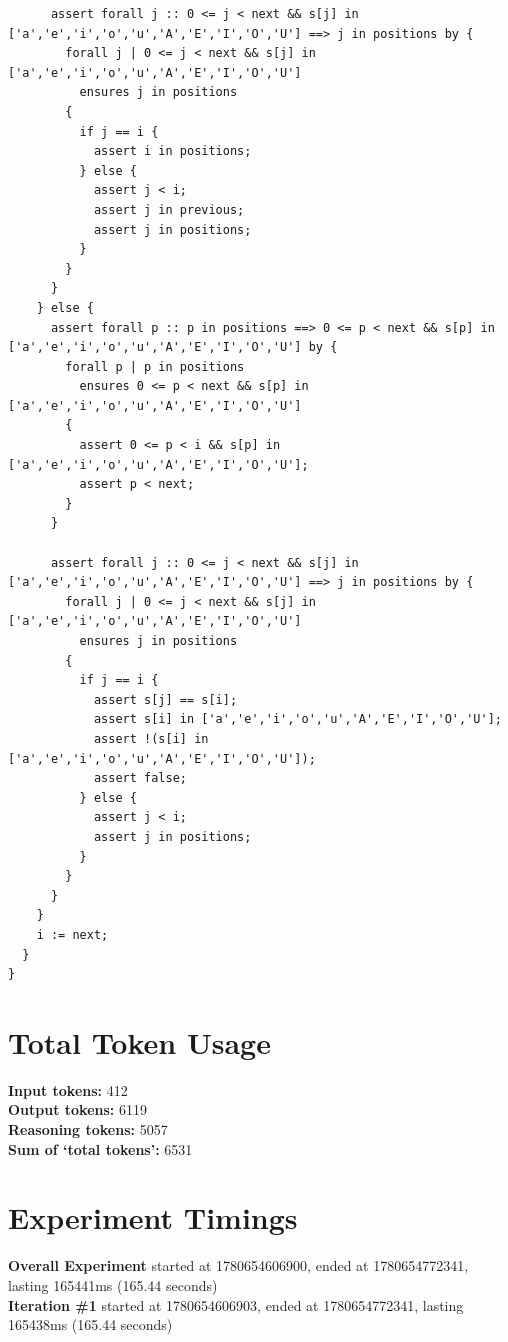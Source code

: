 \documentclass{article}
\begin{document}
\begin{lstlisting}
      assert forall j :: 0 <= j < next && s[j] in ['a','e','i','o','u','A','E','I','O','U'] ==> j in positions by {
        forall j | 0 <= j < next && s[j] in ['a','e','i','o','u','A','E','I','O','U']
          ensures j in positions
        {
          if j == i {
            assert i in positions;
          } else {
            assert j < i;
            assert j in previous;
            assert j in positions;
          }
        }
      }
    } else {
      assert forall p :: p in positions ==> 0 <= p < next && s[p] in ['a','e','i','o','u','A','E','I','O','U'] by {
        forall p | p in positions
          ensures 0 <= p < next && s[p] in ['a','e','i','o','u','A','E','I','O','U']
        {
          assert 0 <= p < i && s[p] in ['a','e','i','o','u','A','E','I','O','U'];
          assert p < next;
        }
      }

      assert forall j :: 0 <= j < next && s[j] in ['a','e','i','o','u','A','E','I','O','U'] ==> j in positions by {
        forall j | 0 <= j < next && s[j] in ['a','e','i','o','u','A','E','I','O','U']
          ensures j in positions
        {
          if j == i {
            assert s[j] == s[i];
            assert s[i] in ['a','e','i','o','u','A','E','I','O','U'];
            assert !(s[i] in ['a','e','i','o','u','A','E','I','O','U']);
            assert false;
          } else {
            assert j < i;
            assert j in positions;
          }
        }
      }
    }
    i := next;
  }
}
\end{lstlisting}
\section*{Total Token Usage}
\textbf{Input tokens: }412
\\\textbf{Output tokens: }6119
\\\textbf{Reasoning tokens: }5057
\\\textbf{Sum of `total tokens': }6531
\section*{Experiment Timings}
\textbf{Overall Experiment} started at 1780654606900, ended at 1780654772341, lasting 165441ms (165.44 seconds)
\\\textbf{Iteration \#1} started at 1780654606903, ended at 1780654772341, lasting 165438ms (165.44 seconds)
\end{document}
